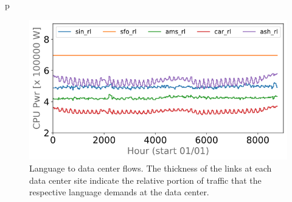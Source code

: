 p\begin{figure}[h!]\centering
    \includegraphics[scale=0.4]{embodied_cost_model/images/cpu_profile.png}
    \caption[Language to Data Center Site Sankey Diagram]{Language to data center flows. The thickness of the links at each data center site indicate the relative portion of traffic that the respective language demands at the data center.}
    \label{image:cpu_profile}
    \end{figure}